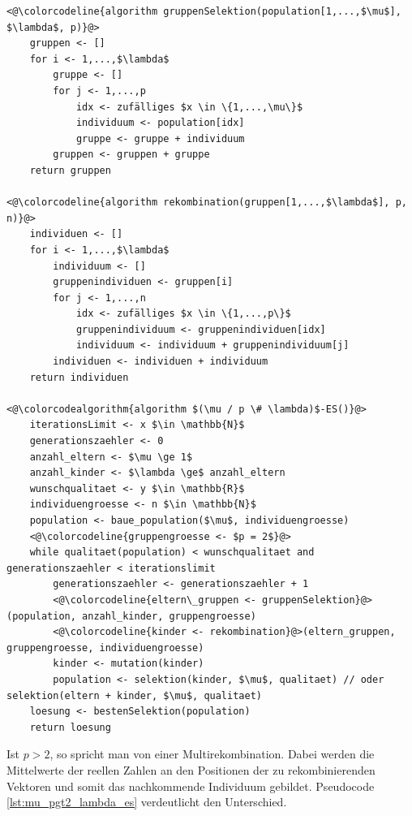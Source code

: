 \begin{lstlisting}[caption={$(\mu / p \# \lambda)$-Evolutionsstrategie mit $p = 2$}, firstnumber=1, captionpos=b, label=lst:mu_p2_lambda_es]
<@\colorcodeline{algorithm gruppenSelektion(population[1,...,$\mu$], $\lambda$, p)}@>
	gruppen <- []
	for i <- 1,...,$\lambda$
		gruppe <- []
		for j <- 1,...,p
			idx <- zufälliges $x \in \{1,...,\mu\}$
			individuum <- population[idx]
			gruppe <- gruppe + individuum
		gruppen <- gruppen + gruppe
	return gruppen

<@\colorcodeline{algorithm rekombination(gruppen[1,...,$\lambda$], p, n)}@>
	individuen <- []
	for i <- 1,...,$\lambda$
		individuum <- []
		gruppenindividuen <- gruppen[i]
		for j <- 1,...,n
			idx <- zufälliges $x \in \{1,...,p\}$
			gruppenindividuum <- gruppenindividuen[idx]
			individuum <- individuum + gruppenindividuum[j]
		individuen <- individuen + individuum
	return individuen

<@\colorcodealgorithm{algorithm $(\mu / p \# \lambda)$-ES()}@>
	iterationsLimit <- x $\in \mathbb{N}$
	generationszaehler <- 0
	anzahl_eltern <- $\mu \ge 1$
	anzahl_kinder <- $\lambda \ge$ anzahl_eltern
	wunschqualitaet <- y $\in \mathbb{R}$
	individuengroesse <- n $\in \mathbb{N}$
	population <- baue_population($\mu$, individuengroesse)
	<@\colorcodeline{gruppengroesse <- $p = 2$}@>
	while qualitaet(population) < wunschqualitaet and generationszaehler < iterationslimit
		generationszaehler <- generationszaehler + 1
		<@\colorcodeline{eltern\_gruppen <- gruppenSelektion}@>(population, anzahl_kinder, gruppengroesse)
		<@\colorcodeline{kinder <- rekombination}@>(eltern_gruppen, gruppengroesse, individuengroesse)
		kinder <- mutation(kinder)
		population <- selektion(kinder, $\mu$, qualitaet) // oder selektion(eltern + kinder, $\mu$, qualitaet)
	loesung <- bestenSelektion(population)
	return loesung
\end{lstlisting}


Ist $p > 2$, so spricht man von einer Multirekombination.
Dabei werden die Mittelwerte der reellen Zahlen an den Positionen der zu rekombinierenden Vektoren und somit das nachkommende Individuum gebildet.
Pseudocode \ref{lst:mu_pgt2_lambda_es} verdeutlicht den Unterschied.

